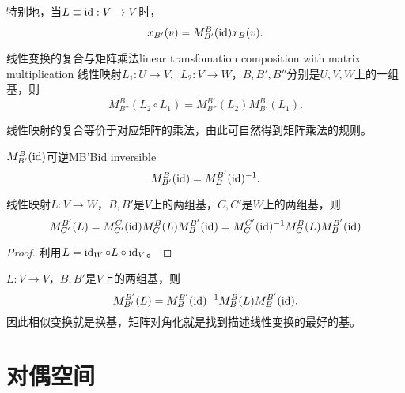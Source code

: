特别地，当$L\equiv\operatorname{id}:V\to V$时， 
\[
	x_{B'}(v)=M_{B'}^B(\operatorname{id})x_B(v).
\]
\begin{theorem}{线性变换的复合与矩阵乘法}{linear transfomation composition with matrix multiplication}
	线性映射$L_1:U\to V,\enspace L_2:V\to W$，$B,B',B''$分别是$U,V,W$上的一组基，则
	\[
		M_{B''}^B(L_2\circ L_1)=M_{B''}^{B'}(L_2)M_{B'}^B(L_1).
	\]
\end{theorem}
\noindent 线性映射的复合等价于对应矩阵的乘法，由此可自然得到矩阵乘法的规则。
\begin{theorem}{$M_{B'}^B(\operatorname{id})$可逆}{MB'Bid inversible}
	\[
		M_{B'}^B(\operatorname{id})=M_B^{B'}(\operatorname{id})^{-1}.
	\]
\end{theorem}
\begin{theorem}{}{}
	线性映射$L:V\to W$，$B,B'$是$V$上的两组基，$C,C'$是$W$上的两组基，则
	\[
		M_{C'}^{B'}(L)=M_{C'}^C(\operatorname{id})M_C^B(L)M_B^{B'}(\operatorname{id})=M_C^{C'}(\operatorname{id})^{-1} M_C^B(L)M_B^{B'}(\operatorname{id})
	\]
\end{theorem}
\begin{proof}
	利用$L=\operatorname{id}_W\circ L\circ\operatorname{id}_V$。
\end{proof}
\begin{corollary}
	$L:V\to V$，$B,B'$是$V$上的两组基，则
	\[
		M_{B'}^{B'}(L)=M_B^{B'}(\operatorname{id})^{-1} M_B^B(L)M_B^{B'}(\operatorname{id}).
	\]
	因此相似变换就是换基，矩阵对角化就是找到描述线性变换的最好的基。
\end{corollary}

\section{对偶空间}

